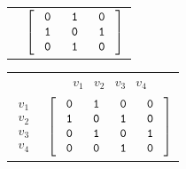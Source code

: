 \begin{exam}
\begin{actpart}
\begin{table}[htbp]
\begin{tabular} {cc}
                    & $\left[ \begin{array} {cccccc} 
                    ~\bs{0}~ & ~\bs{1}~ & ~\bs{0}~ \\
                    \bs{1} & \bs{0} & \bs{1} \\
                    \bs{0} & \bs{1} & \bs{0} \\
                    \end{array} \right]$ \\
                \end{tabular}
                \hspace{.15in}
                \begin{tabular} {cc}
                    & $\begin{array} {cccc} v_1&v_2&v_3&v_4 \end{array}$ \\ 
                    $\begin{array}{r} v_1 \\ v_2 \\ v_3 \\v_4 \end{array}$  
                    & $\left[ \begin{array} {cccccc} 
                    ~\bs{0}~ & ~\bs{1}~ & ~\bs{0}~ & ~\bs{0}~\\
                    \bs{1} & \bs{0} & \bs{1} & \bs{0} \\
                    \bs{0} & \bs{1} & \bs{0} & \bs{1} \\
                    \bs{0} & \bs{0} & \bs{1} & \bs{0} \\
                    \end{array} \right]$ \\
                \end{tabular}
                \hspace{.15in}
                \begin{tabular} {cc}
                    & $\begin{array} {ccccc} v_1&v_2&v_3&v_4&v_5 \end{array}$ \\ 
                    $\begin{array}{r} v_1 \\ v_2 \\ v_3 \\v_4\\v_5 \end{array}$  
                    & $\left[ \begin{array} {cccccc} 

\end{array}
\end{tabular}
\end{table}
\end{actpart}
\end{exam}
